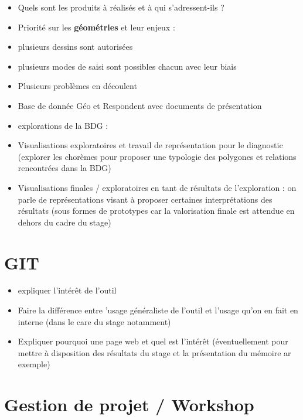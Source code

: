 \documentclass[
  12pt,
  a4paper,
]{scrbook}
\providecommand{\tightlist}{%
  \setlength{\itemsep}{0pt}\setlength{\parskip}{0pt}}\usepackage{longtable,booktabs,array}
\begin{document}
\begin{itemize}
\tightlist
\item
  Quels sont les produits à réalisés et à qui s'adressent-ils ?
\item
  Priorité sur les \textbf{géométries} et leur enjeux :
\item
  plusieurs dessins sont autorisées
\item
  plusieurs modes de saisi sont possibles chacun avec leur biais
\item
  Plusieurs problèmes en découlent
\item
  Base de donnée Géo et Respondent avec documents de présentation
\item
  explorations de la BDG :
\item
  Visualisations exploratoires et travail de représentation pour le
  diagnostic (explorer les chorèmes pour proposer une typologie des
  polygones et relations rencontrées dans la BDG)
\item
  Visualisations finales / exploratoires en tant de résultats de
  l'exploration : on parle de représentations visant à proposer
  certaines interprétations des résultats (sous formes de prototypes car
  la valorisation finale est attendue en dehors du cadre du stage)
\end{itemize}

\hypertarget{git}{%
\section*{GIT}\label{git}}

\begin{itemize}
\tightlist
\item
  expliquer l'intérêt de l'outil
\item
  Faire la différence entre 'usage généraliste de l'outil et l'usage
  qu'on en fait en interne (dans le care du stage notamment)
\item
  Expliquer pourquoi une page web et quel est l'intérêt (éventuellement
  pour mettre à disposition des résultats du stage et la présentation du
  mémoire ar exemple)
\end{itemize}

\hypertarget{gestion-de-projet-workshop}{%
\section*{Gestion de projet /
Workshop}\label{gestion-de-projet-workshop}}
\end{document}
